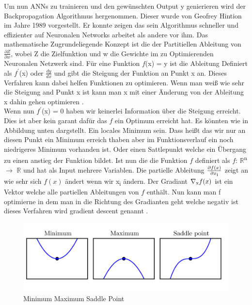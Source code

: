 \documentclass{llncs}
\begin{document}
Um nun ANNs zu trainieren und den gewünschten Output y genierieren wird der Backpropagation Algorithmus hergenommen. Dieser wurde von Geofrey Hintion im Jahre 1989 vorgestellt\cite{backpro}. Er konnte zeigen das sein Algorithmus schneller und effizienter auf Neuronalen Networks arbeitet als andere vor ihm. Das mathematische Zugrundeliegende Konzept ist die der Partitiellen Ableitung von  $\frac{\partial Z}{\partial w}$, wobei Z die Zielfunktion und w die Gewichte im zu Optimierenden Neuronalen Netzwerk sind. Für eine Funktion $f$(x) = y ist die Ableitung Definiert als $f^\prime$(x) oder $\frac{dy}{dx}$ und gibt die Steigung der Funktion an Punkt x an. Dieses Verfahren kann dabei helfen Funktionen zu optimieren. Wenn man weiß wie sehr die Steigung and Punkt x ist kann man x mit einer Änderung von der Ableitung x dahin gehen optimieren \cite{Grundlagen}. \\
Wenn nun $f^\prime$(x) = 0 haben wir keinerlei Information über die Steigung erreicht. Dies ist aber kein garant dafür das $f$ ein Optimum erreicht hat.  Es könnten wie in Abbildung unten dargstellt. Ein locales Minimum sein. Dass heißt das wir nur an diesen Punkt ein Minimum erreich thaben aber im Funktionsverlauf ein noch niedrigeres Minimum vorhanden ist. Oder einen Sattlepunkt welche ein Übergang zu einen anstieg der Funktion bildet.
Ist nun die die Funktion $f$ definiert als $f$: $\mathbb{R}$\textsuperscript{n} $\rightarrow$  $\mathbb{R}$ und hat als Input mehrere Variablen. Die partielle Ableitung $\frac{\partial f(x)}{\partial x\textsubscript{i}}$ zeigt an wie sehr sich $f(x)$ ändert wenn wir x\textsubscript{i} ändern. Der Gradiant $\nabla\textsubscript{x}f(x)$ ist ein Vektor welche alle partiellen Ableitungen von $f$ enthält. Nun kann man f optimierne in dem man in die Richtung des Gradianten geht welche negativ ist dieses Verfahren wird gradient descent genannt \cite{Grundlagen}.
\begin{figure}[htbp] 
	\centering
	\includegraphics[width=1.0\textwidth]{saddle.png}
	\caption{Minimum Maximum Saddle Point}
	\label{fig:Bild5}
\end{figure}
\end{document}
